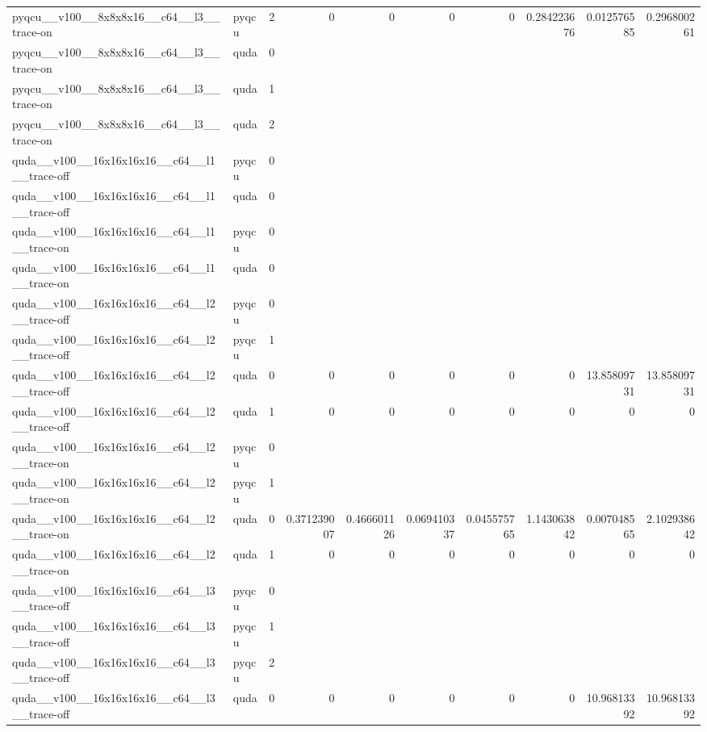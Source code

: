 \begin{table}[htbp]
\begin{tabular}{@{}llrrrrrrrr@{}}
pyqcu\_\_v100\_\_8x8x8x16\_\_c64\_\_l3\_\_trace-on & pyqcu & 2 & 0 & 0 & 0 & 0 & 0.284223676 & 0.012576585 & 0.296800261 \\
pyqcu\_\_v100\_\_8x8x8x16\_\_c64\_\_l3\_\_trace-on & quda & 0 &  &  &  &  &  &  &  \\
pyqcu\_\_v100\_\_8x8x8x16\_\_c64\_\_l3\_\_trace-on & quda & 1 &  &  &  &  &  &  &  \\
pyqcu\_\_v100\_\_8x8x8x16\_\_c64\_\_l3\_\_trace-on & quda & 2 &  &  &  &  &  &  &  \\
quda\_\_v100\_\_16x16x16x16\_\_c64\_\_l1\_\_trace-off & pyqcu & 0 &  &  &  &  &  &  &  \\
quda\_\_v100\_\_16x16x16x16\_\_c64\_\_l1\_\_trace-off & quda & 0 &  &  &  &  &  &  &  \\
quda\_\_v100\_\_16x16x16x16\_\_c64\_\_l1\_\_trace-on & pyqcu & 0 &  &  &  &  &  &  &  \\
quda\_\_v100\_\_16x16x16x16\_\_c64\_\_l1\_\_trace-on & quda & 0 &  &  &  &  &  &  &  \\
quda\_\_v100\_\_16x16x16x16\_\_c64\_\_l2\_\_trace-off & pyqcu & 0 &  &  &  &  &  &  &  \\
quda\_\_v100\_\_16x16x16x16\_\_c64\_\_l2\_\_trace-off & pyqcu & 1 &  &  &  &  &  &  &  \\
quda\_\_v100\_\_16x16x16x16\_\_c64\_\_l2\_\_trace-off & quda & 0 & 0 & 0 & 0 & 0 & 0 & 13.85809731 & 13.85809731 \\
quda\_\_v100\_\_16x16x16x16\_\_c64\_\_l2\_\_trace-off & quda & 1 & 0 & 0 & 0 & 0 & 0 & 0 & 0 \\
quda\_\_v100\_\_16x16x16x16\_\_c64\_\_l2\_\_trace-on & pyqcu & 0 &  &  &  &  &  &  &  \\
quda\_\_v100\_\_16x16x16x16\_\_c64\_\_l2\_\_trace-on & pyqcu & 1 &  &  &  &  &  &  &  \\
quda\_\_v100\_\_16x16x16x16\_\_c64\_\_l2\_\_trace-on & quda & 0 & 0.371239007 & 0.466601126 & 0.069410337 & 0.045575765 & 1.143063842 & 0.007048565 & 2.102938642 \\
quda\_\_v100\_\_16x16x16x16\_\_c64\_\_l2\_\_trace-on & quda & 1 & 0 & 0 & 0 & 0 & 0 & 0 & 0 \\
quda\_\_v100\_\_16x16x16x16\_\_c64\_\_l3\_\_trace-off & pyqcu & 0 &  &  &  &  &  &  &  \\
quda\_\_v100\_\_16x16x16x16\_\_c64\_\_l3\_\_trace-off & pyqcu & 1 &  &  &  &  &  &  &  \\
quda\_\_v100\_\_16x16x16x16\_\_c64\_\_l3\_\_trace-off & pyqcu & 2 &  &  &  &  &  &  &  \\
quda\_\_v100\_\_16x16x16x16\_\_c64\_\_l3\_\_trace-off & quda & 0 & 0 & 0 & 0 & 0 & 0 & 10.96813392 & 10.96813392 \\

\end{tabular}
\end{table}
